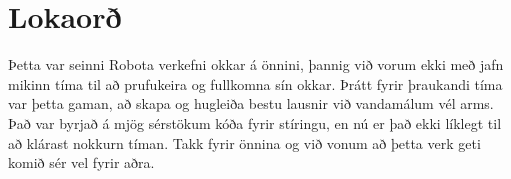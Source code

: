 \section{Lokaorð}
Þetta var seinni Robota verkefni okkar á önnini, þannig við vorum ekki með jafn mikinn tíma til að prufukeira og fullkomna sín okkar. Þrátt fyrir þraukandi tíma var þetta gaman, að skapa og hugleiða bestu lausnir við vandamálum vél arms. Það var byrjað á mjög sérstökum kóða fyrir stíringu, en nú er það ekki líklegt til að klárast nokkurn tíman. 
Takk fyrir önnina og við vonum að þetta verk geti komið sér vel fyrir aðra.